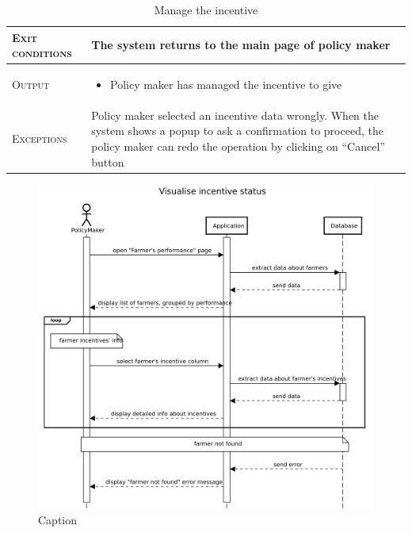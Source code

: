 \begin{table}[H]
\begin{tabular}{|l|p{}|}
        \hline %
        \textsc{Exit conditions}    &  The system returns to the main page of policy maker\\
    	\hline %
    	\textsc{Output}             &  \begin{itemize}
    	    \item Policy maker has managed the incentive to give
    	\end{itemize}\\
    	\hline %
    	\textsc{Exceptions}         &  Policy maker selected an incentive data wrongly. When the 
    	system shows a popup to ask a confirmation to proceed, the policy maker can redo the operation by clicking on “Cancel” button\\
    	\hline %
        
    \end{tabular}
    \caption{\label{tab:visualize_incentives}Manage the incentive} %
\end{table}

\begin{figure}[H]
    \centering
    \includegraphics[scale=0.5]{Images/Sequence diagrams/PolicyMaker - visualise incentive status.pdf}
    \caption{Caption}
    \label{fig:my_label}
\end{figure}

